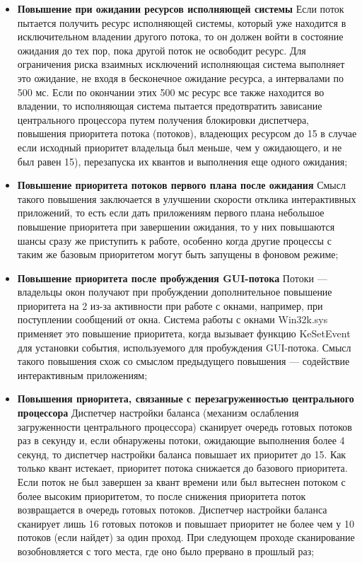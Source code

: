 \documentclass[a4paper,14pt,russian]{extreport}
\begin{document}
\begin{itemize}
		\item \textbf{Повышение при ожидании ресурсов исполняющей системы}
		Если поток пытается получить ресурс исполняющей системы, который уже находится в исключительном владении другого потока, то он должен войти в состояние ожидания до тех пор, пока другой поток не освободит ресурс.
		Для ограничения риска взаимных исключений исполняющая система выполняет это ожидание, не входя в бесконечное ожидание ресурса, а интервалами по 500 мс.
		Если по окончании этих 500 мс ресурс все также находится во владении, то исполняющая система пытается предотвратить зависание центрального процессора путем получения блокировки диспетчера, повышения приоритета потока (потоков), владеющих ресурсом до 15 в случае если исходный приоритет владельца был меньше, чем у ожидающего, и не был равен 15), перезапуска их квантов и выполнения еще одного ожидания;
		
		\item \textbf{Повышение приоритета потоков первого плана после ожидания}
		Смысл такого повышения заключается в улучшении скорости отклика интерактивных приложений, то есть если дать приложениям первого плана небольшое повышение приоритета при завершении ожидания, то у них повышаются шансы сразу же приступить к работе, особенно когда другие процессы с таким же базовым приоритетом могут быть запущены в фоновом режиме;
		
		\item \textbf{Повышение приоритета после пробуждения GUI-потока}
		Потоки — владельцы окон получают при пробуждении дополнительное повышение приоритета на 2 из-за активности при работе с окнами, например, при поступлении сообщений от окна.
		Система работы с окнами Win32k.sys применяет это повышение приоритета, когда вызывает функцию KeSetEvent для установки события, используемого для пробуждения GUI-потока.
		Смысл такого повышения схож со смыслом предыдущего повышения — содействие интерактивным приложениям;
		
		\item \textbf{Повышения приоритета, связанные с перезагруженностью
		центрального процессора}
		Диспетчер настройки баланса (механизм ослабления загруженности центрального процессора) сканирует очередь готовых потоков раз в секунду и, если обнаружены потоки, ожидающие выполнения более 4 секунд, то диспетчер настройки баланса повышает их приоритет до 15.
		Как только квант истекает, приоритет потока снижается до базового приоритета.
		Если поток не был завершен за квант времени или был вытеснен потоком с более высоким приоритетом, то после снижения приоритета поток возвращается в очередь готовых потоков.
		Диспетчер настройки баланса сканирует лишь 16 готовых потоков и повышает приоритет не более чем у 10 потоков (если найдет) за один проход.
		При следующем проходе сканирование возобновляется с того места, где оно было прервано в прошлый раз;
		

\end{itemize}
\end{document}
